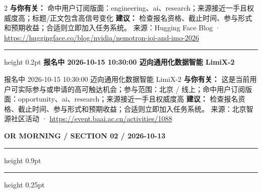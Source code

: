 \documentclass[10.5pt]{ctexart}
\begin{document}
\begin{multicols}{2}
\textbf{与你有关：} 命中用户订阅版面：engineering、ai、research；来源接近一手且权威度高；标题/正文包含高信号变化
\textbf{建议：} 检查报名资格、截止时间、参与形式和预期收益；合适则立即加入任务系统。
{\footnotesize\color{ormuted} 来源：Hugging Face Blog · \url{https://huggingface.co/blog/nvidia/nemotron-ioi-and-imo-2026}}
\vspace{2mm}
\hrule height 0.2pt
\vspace{2mm}
{\large\bfseries 报名中 2026-10-15 10:30:00 迈向通用化数据智能 LimiX-2}\par
报名中 2026-10-15 10:30:00 迈向通用化数据智能 LimiX-2
\textbf{与你有关：} 这是当前用户可实际参与或申请的高可触达机会；参与范围：北京 / 线上；命中用户订阅版面：opportunity、ai、research；来源接近一手且权威度高
\textbf{建议：} 检查报名资格、截止时间、参与形式和预期收益；合适则立即加入任务系统。
{\footnotesize\color{ormuted} 来源：北京智源社区活动 · \url{https://event.baai.ac.cn/activities/1088}}
\end{multicols}
\newpage
{\small\bfseries OR MORNING / SECTION 02 / 2026-10-13}
\vspace{2mm}
\hrule height 0.9pt
\vspace{1.5mm}
\hrule height 0.25pt
\vspace{4mm}
\end{document}
